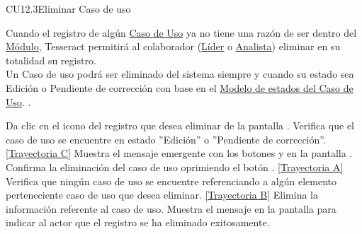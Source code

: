 	\begin{UseCase}{CU12.3}{Eliminar Caso de uso}{
	
		Cuando el registro de algún \hyperlink{casoUso}{Caso de Uso} ya no tiene una razón de ser dentro del \hyperlink{moduloEntidad}{Módulo}, Tesseract permitirá al colaborador (\hyperlink{jefe}{Líder} o \hyperlink{analista}{Analista}) eliminar en su totalidad su registro. \\
	
		Un Caso de uso podrá ser eliminado del sistema siempre y cuando su estado sea Edición o Pendiente de corrección con base en el \hyperlink{edoCU}{Modelo de estados del Caso de Uso}.  .
}
	\end{UseCase}
	\begin{UCtrayectoria}
		\UCpaso[\UCactor] Da clic en el icono \eliminar del registro que desea eliminar de la pantalla .
		\UCpaso[\UCsist] Verifica que el caso de uso se encuentre en estado ''Edición'' o ''Pendiente de corrección''. \hyperlink{CU12-3:TAC}{[Trayectoria C]}
		\UCpaso[\UCsist] Muestra el mensaje emergente  con los botones  y  en la pantalla .
		\UCpaso[\UCactor] Confirma la eliminación del caso de uso oprimiendo el botón . \hyperlink{CU12-3:TAA}{[Trayectoria A]}
		\UCpaso[\UCsist] Verifica que ningún caso de uso se encuentre referenciando a algún elemento perteneciente caso de uso que desea eliminar. \hyperlink{CU12-3:TAB}{[Trayectoria B]}
		\UCpaso[\UCsist] Elimina la información referente al caso de uso.
		\UCpaso[\UCsist] Muestra el mensaje  en la pantalla  para indicar al actor que el registro se ha eliminado exitosamente.
	\end{UCtrayectoria}		
